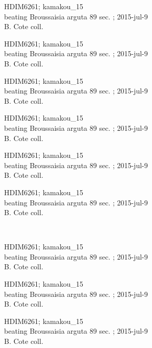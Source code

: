 \documentclass[2pt]{extarticle}
\begin{document}
\noindent
\parbox{0.16\textwidth}{\tiny \raggedright \rule[-0.3\baselineskip]{0pt}{10pt}HDIM6261; kamakou\_15\\ beating Broussaisia arguta 89 sec. ; 2015-jul-9\\ B. Cote coll.}
\parbox{0.16\textwidth}{\tiny \raggedright \rule[-0.3\baselineskip]{0pt}{10pt}HDIM6261; kamakou\_15\\ beating Broussaisia arguta 89 sec. ; 2015-jul-9\\ B. Cote coll.}
\parbox{0.16\textwidth}{\tiny \raggedright \rule[-0.3\baselineskip]{0pt}{10pt}HDIM6261; kamakou\_15\\ beating Broussaisia arguta 89 sec. ; 2015-jul-9\\ B. Cote coll.}
\parbox{0.16\textwidth}{\tiny \raggedright \rule[-0.3\baselineskip]{0pt}{10pt}HDIM6261; kamakou\_15\\ beating Broussaisia arguta 89 sec. ; 2015-jul-9\\ B. Cote coll.}
\parbox{0.16\textwidth}{\tiny \raggedright \rule[-0.3\baselineskip]{0pt}{10pt}HDIM6261; kamakou\_15\\ beating Broussaisia arguta 89 sec. ; 2015-jul-9\\ B. Cote coll.}
\parbox{0.16\textwidth}{\tiny \raggedright \rule[-0.3\baselineskip]{0pt}{10pt}HDIM6261; kamakou\_15\\ beating Broussaisia arguta 89 sec. ; 2015-jul-9\\ B. Cote coll.} \\ 
\vspace{0.001in} 

\noindent
\parbox{0.16\textwidth}{\tiny \raggedright \rule[-0.3\baselineskip]{0pt}{10pt}HDIM6261; kamakou\_15\\ beating Broussaisia arguta 89 sec. ; 2015-jul-9\\ B. Cote coll.}
\parbox{0.16\textwidth}{\tiny \raggedright \rule[-0.3\baselineskip]{0pt}{10pt}HDIM6261; kamakou\_15\\ beating Broussaisia arguta 89 sec. ; 2015-jul-9\\ B. Cote coll.}
\parbox{0.16\textwidth}{\tiny \raggedright \rule[-0.3\baselineskip]{0pt}{10pt}HDIM6261; kamakou\_15\\ beating Broussaisia arguta 89 sec. ; 2015-jul-9\\ B. Cote coll.}
\end{document}
